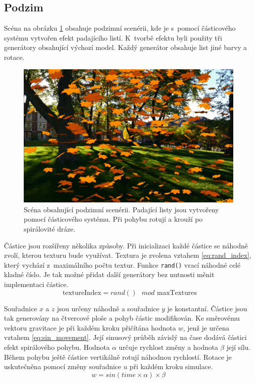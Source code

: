 \subsection*{Podzim}
Scéna na obrázku \ref{fig:ps_podzim} obsahuje podzimní scenérii, kde je s~pomocí částicového systému vytvořen efekt padajícího listí. K~tvorbě efektu byli použity tři generátory obsahující výchozí model. Každý generátor obsahuje list jiné barvy a rotace.  

\begin{figure}[H]
	\centering
	\includegraphics[width=1.0\textwidth]{obrazky-figures/podzim.png}
	\caption{Scéna obsahující podzimní scenérii. Padající listy jsou vytvořeny pomocí částicového systému. Při pohybu rotují a krouží po spirálovité dráze.}
	\label{fig:ps_podzim}
\end{figure}

Částice jsou rozšířeny několika způsoby. Při inicializaci každé částice se náhodně zvolí, kterou texturu bude využívat. Textura je zvolena vztahem \ref{eq:rand_index}, který vychází z~maximálního počtu textur. Funkce \texttt{rand()} vrací náhodné celé kladné číslo. Je tak možné přidat další generátory bez nutnosti měnit implementaci částice.
\begin{equation}
    \label{eq:rand_index}
    \text{ textureIndex} = rand() \text{ } mod \text{ maxTextures} 
\end{equation}

Souřadnice $x$ a $z$ jsou určeny náhodně a souřadnice $y$ je konstantní. Částice jsou tak generovány na čtvercové ploše a pohyb částic modifikován. Ke směrovému vektoru gravitace je při každém kroku přičítána hodnota $w$, jenž je určena vztahem \ref{eq:sin_movement}. Její sinusový průběh závislý na čase dodává částici efekt spirálového pohybu. Hodnota $\alpha$ určuje rychlost změny a hodnota $\beta$ její sílu. Během pohybu ještě částice vertikálně rotují náhodnou rychlostí. Rotace je uskutečněna pomocí změny souřadnice $u$ při každém kroku simulace. 
\begin{equation}
    \label{eq:sin_movement}
    w = sin(time \times \alpha) \times \beta
\end{equation}

